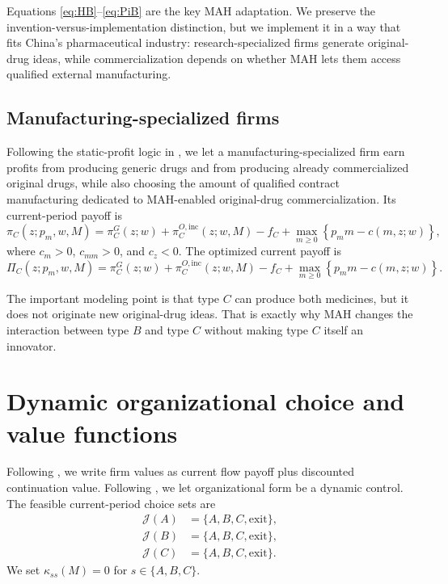 \documentclass[12pt]{article}
\newcommand{\1}{\mathbf{1}}
\begin{document}
Equations \eqref{eq:HB}--\eqref{eq:PiB} are the key MAH adaptation. We preserve the invention-versus-implementation distinction, but we implement it in a way that fits China's pharmaceutical industry: research-specialized firms generate original-drug ideas, while commercialization depends on whether MAH lets them access qualified external manufacturing.

\subsection{Manufacturing-specialized firms}

Following the static-profit logic in \citet{Hopenhayn1992}, we let a manufacturing-specialized firm earn profits from producing generic drugs and from producing already commercialized original drugs, while also choosing the amount of qualified contract manufacturing dedicated to MAH-enabled original-drug commercialization. Its current-period payoff is
\begin{equation}
\pi_C(z;p_m,w,M)
=
\pi_C^G(z;w)
+\pi_C^{O,\mathrm{inc}}(z;w,M)
-f_C
+\max_{m\ge 0}\left\{p_m m-c(m,z;w)\right\},
\label{eq:piC}
\end{equation}
where $c_m>0$, $c_{mm}>0$, and $c_z<0$. The optimized current payoff is
\begin{equation}
\Pi_C(z;p_m,w,M)
=
\pi_C^G(z;w)
+\pi_C^{O,\mathrm{inc}}(z;w,M)
-f_C
+\max_{m\ge 0}\left\{p_m m-c(m,z;w)\right\}.
\label{eq:PiC}
\end{equation}

The important modeling point is that type $C$ can produce both medicines, but it does not originate new original-drug ideas. That is exactly why MAH changes the interaction between type $B$ and type $C$ without making type $C$ itself an innovator.

\section{Dynamic organizational choice and value functions}

Following \citet{Hopenhayn1992}, we write firm values as current flow payoff plus discounted continuation value. Following \citet{EricsonPakes1995}, we let organizational form be a dynamic control. The feasible current-period choice sets are
\begin{align}
\mathcal J(A)&=\{A,B,C,\text{exit}\}, \\
\mathcal J(B)&=\{A,B,C,\text{exit}\}, \\
\mathcal J(C)&=\{A,B,C,\text{exit}\}.
\end{align}
We set $\kappa_{ss}(M)=0$ for $s\in\{A,B,C\}$.
\end{document}

